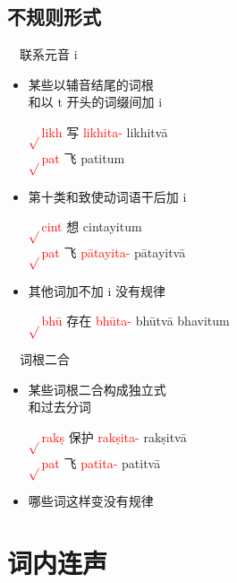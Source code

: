 \documentclass[17pt]{beamer}
\newcommand{\verbroot}[1]{\textcolor{red}{$\sqrt{}$#1}}
\newcommand{\nounstem}[1]{\textcolor{red}{#1\nobreakdash-}}
\newcommand{\fullpada}[1]{\textcolor{OliveGreen}{#1}}
\begin{document}
\subsection{不规则形式}
\begin{frame}{\insertsubsection ~~联系元音 i}
  \begin{itemize}
    \item 某些以辅音结尾的词根\\和以 t 开头的词缀间加 i
    
    \verbroot{likh} 写 \nounstem{likhita} \fullpada{likhitvā}\\
    \verbroot{pat} 飞 \fullpada{patitum} 
    \item 第十类和致使动词语干后加 i
    
    \verbroot{cint} 想 \fullpada{cintayitum}\\
    \verbroot{pat} 飞 \nounstem{pātayita} \fullpada{pātayitvā}

    \item 其他词加不加 i 没有规律

    \verbroot{bhū} 存在 \nounstem{bhūta} \fullpada{bhūtvā} \fullpada{bhavitum}
  \end{itemize}  
\end{frame}

\begin{frame}{\insertsubsection ~~词根二合}
  \begin{itemize}
    \item 某些词根二合构成独立式\\和过去分词

    \verbroot{rakṣ} 保护 \nounstem{rakṣita} \fullpada{rakṣitvā}\\
    \verbroot{pat} 飞 \nounstem{patita} \fullpada{patitvā}
    \item 哪些词这样变没有规律
  \end{itemize}  
\end{frame}

\section{词内连声}
\begin{frame}{\insertsection }
  \small
  \tableofcontents[currentsection]
\end{frame}
\end{document}
